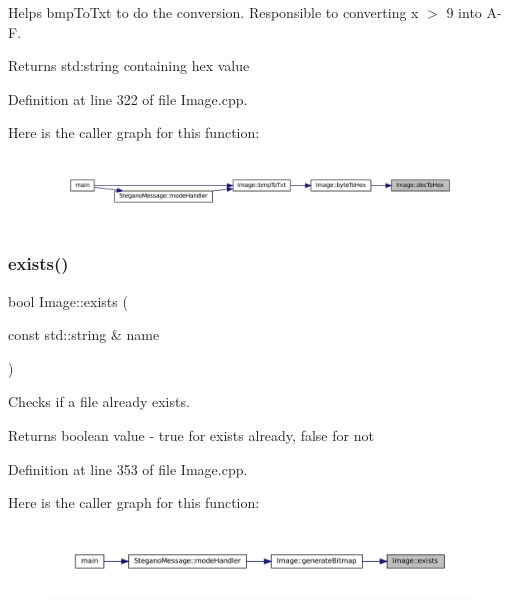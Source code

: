 Helps bmp\+To\+Txt to do the conversion. Responsible to converting x $>$ 9 into A-\/F. 

\begin{DoxyReturn}{Returns}
std\+:string containing hex value 
\end{DoxyReturn}


Definition at line 322 of file Image.\+cpp.

Here is the caller graph for this function\+:\nopagebreak
\begin{figure}[H]
\begin{center}
\leavevmode
\includegraphics[width=350pt]{classImage_a26f7e0b2649e2529df7e7aea46f2da4a_icgraph}
\end{center}
\end{figure}
\mbox{\label{classImage_a83d7183bfcd632649c36504d9ab07e36}} 
\subsubsection{\texorpdfstring{exists()}{exists()}}
{\footnotesize\ttfamily bool Image\+::exists (\begin{DoxyParamCaption}\item[{const std\+::string \&}]{name }\end{DoxyParamCaption})\hspace{0.3cm}{\ttfamily [protected]}}



Checks if a file already exists. 

\begin{DoxyReturn}{Returns}
boolean value -\/ true for exists already, false for not 
\end{DoxyReturn}


Definition at line 353 of file Image.\+cpp.

Here is the caller graph for this function\+:\nopagebreak
\begin{figure}[H]
\begin{center}
\leavevmode
\includegraphics[width=350pt]{classImage_a83d7183bfcd632649c36504d9ab07e36_icgraph}
\end{center}
\end{figure}
\mbox{\label{classImage_a3ca1ae6c1eb2846bfba066b01e6020e1}} 
